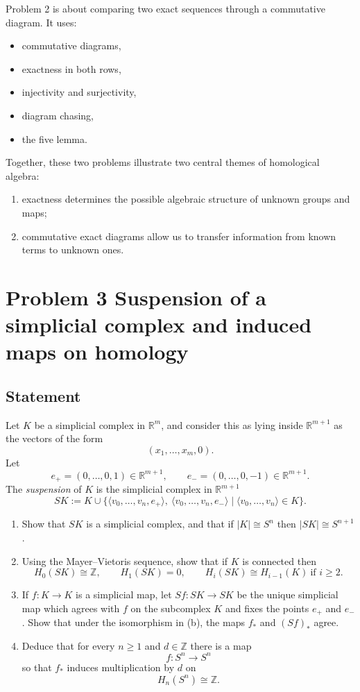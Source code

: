 \documentclass[12pt,a4paper]{article}
\theoremstyle{notespace}
\begin{document}
Problem 2 is about comparing two exact sequences through a commutative diagram. It uses:

\begin{itemize}
	\item commutative diagrams,
	\item exactness in both rows,
	\item injectivity and surjectivity,
	\item diagram chasing,
	\item the five lemma.
\end{itemize}

Together, these two problems illustrate two central themes of homological algebra:

\begin{enumerate}
	\item exactness determines the possible algebraic structure of unknown groups and maps;
	\item commutative exact diagrams allow us to transfer information from known terms to unknown ones.
\end{enumerate}

\section{Problem 3 Suspension of a simplicial complex and induced maps on homology}

\subsection*{Statement}
Let \(K\) be a simplicial complex in \(\mathbb R^m\), and consider this as lying inside \(\mathbb R^{m+1}\) as the vectors of the form
\[
(x_1,\dots,x_m,0).
\]
Let
\[
e_+=(0,\dots,0,1)\in \mathbb R^{m+1},
\qquad
e_-=(0,\dots,0,-1)\in \mathbb R^{m+1}.
\]
The \emph{suspension} of \(K\) is the simplicial complex in \(\mathbb R^{m+1}\)
\[
SK:=K\cup \{\langle v_0,\dots,v_n,e_+\rangle,\ \langle v_0,\dots,v_n,e_-\rangle
\mid \langle v_0,\dots,v_n\rangle\in K\}.
\]

\begin{enumerate}
	\item[(a)] Show that \(SK\) is a simplicial complex, and that if \(|K|\cong S^n\) then \(|SK|\cong S^{n+1}\).
	\item[(b)] Using the Mayer--Vietoris sequence, show that if \(K\) is connected then
	\[
	H_0(SK)\cong \mathbb Z,\qquad H_1(SK)=0,
	\qquad H_i(SK)\cong H_{i-1}(K)\ \text{if } i\ge 2.
	\]
	\item[(c)] If \(f:K\to K\) is a simplicial map, let \(Sf:SK\to SK\) be the unique simplicial map which agrees with \(f\) on the subcomplex \(K\) and fixes the points \(e_+\) and \(e_-\). Show that under the isomorphism in (b), the maps \(f_*\) and \((Sf)_*\) agree.
	\item[(d)] Deduce that for every \(n\ge 1\) and \(d\in \mathbb Z\) there is a map
	\[
	f:S^n\to S^n
	\]
	so that \(f_*\) induces multiplication by \(d\) on
	\[
	H_n(S^n)\cong \mathbb Z.
	\]
\end{enumerate}
\end{document}
